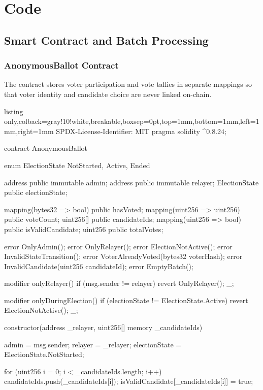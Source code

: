 \chapter{Code}
\section{Smart Contract and Batch Processing}

\subsection{AnonymousBallot Contract}
The contract stores voter participation and vote tallies in separate mappings so that voter identity and candidate choice are never linked on-chain.

\begin{tcblisting}{listing only,colback=gray!10!white,breakable,boxsep=0pt,top=1mm,bottom=1mm,left=1mm,right=1mm}
SPDX-License-Identifier: MIT
pragma solidity ^0.8.24;

contract AnonymousBallot {
    enum ElectionState { NotStarted, Active, Ended }

    address public immutable admin;
    address public immutable relayer;
    ElectionState public electionState;

    mapping(bytes32 => bool) public hasVoted;
    mapping(uint256 => uint256) public voteCount;
    uint256[] public candidateIds;
    mapping(uint256 => bool) public isValidCandidate;
    uint256 public totalVotes;

    error OnlyAdmin();
    error OnlyRelayer();
    error ElectionNotActive();
    error InvalidStateTransition();
    error VoterAlreadyVoted(bytes32 voterHash);
    error InvalidCandidate(uint256 candidateId);
    error EmptyBatch();

    modifier onlyRelayer() {
        if (msg.sender != relayer) revert OnlyRelayer();
        _;
    }

    modifier onlyDuringElection() {
        if (electionState != ElectionState.Active) revert ElectionNotActive();
        _;
    }

    constructor(address _relayer, uint256[] memory _candidateIds) {
        admin = msg.sender;
        relayer = _relayer;
        electionState = ElectionState.NotStarted;

        for (uint256 i = 0; i < _candidateIds.length; i++) {
            candidateIds.push(_candidateIds[i]);
            isValidCandidate[_candidateIds[i]] = true;
        }
    }

}
\end{tcblisting}
